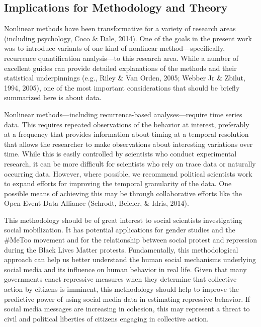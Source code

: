\documentclass[
  english,
  man]{apa6}
\begin{document}
\hypertarget{implications-for-methodology-and-theory}{%
\subsection{Implications for Methodology and Theory}\label{implications-for-methodology-and-theory}}

Nonlinear methods have been transformative for a variety of research areas
(including psychology, Coco \& Dale, 2014). One of the goals in the present work was
to introduce variants of one kind of nonlinear method---specifically, recurrence
quantification analysis---to this research area. While a number of excellent
guides can provide detailed explanations of the methods and their statistical
underpinnings (e.g., Riley \& Van Orden, 2005; Webber Jr \& Zbilut, 1994, 2005), one of the most important considerations that should be
briefly summarized here is about data.

Nonlinear methods---including recurrence-based analyses---require time series
data. This requires repeated observations of the behavior at interest,
preferably at a frequency that provides information about timing at a temporal
resolution that allows the researcher to make observations about interesting
variations over time. While this is easily controlled by scientists who conduct
experimental research, it can be more difficult for scientists who rely on trace
data or naturally occurring data. However, where possible, we recommend
political scientists work to expand efforts for improving the temporal
granularity of the data. One possible means of achieving this may be through
collaborative efforts like the Open Event Data Alliance (Schrodt, Beieler, \& Idris, 2014).

This methodology should be of great interest to social scientists investigating
social mobilization. It has potential applications for gender studies and
the \#MeToo movement and for the relationship between social protest and repression
during the Black Lives Matter protests. Fundamentally, this methodological
approach can help us better understand the human social mechanisms underlying
social media and its influence on human behavior in real life. Given that many
governments enact repressive measures when they determine that collective action
by citizens is imminent, this methodology should help to improve the predictive
power of using social media data in estimating repressive behavior. If social
media messages are increasing in cohesion, this may represent a threat to civil
and political liberties of citizens engaging in collective action.
\end{document}
